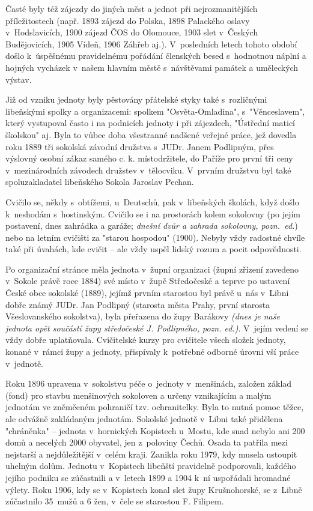 \documentclass[a5paper, 11pt, twoside]{article}
\newcommand{\pozned}[1]{%
\textit{#1}}
\begin{document}
Časté byly též zájezdy do jiných měst a jednot při nejrozmanitějších příležitostech (např. 1893 zájezd do Polska, 1898 Palackého oslavy v~Hodslavicích, 1900 zájezd ČOS do Olomouce, 1903 slet v~Českých Budějovicích, 1905 Vídeň, 1906 \mbox{Záhřeb} aj.). V~posledních letech tohoto období došlo k~úspěšnému pravidelnému pořádání členských besed s~hodnotnou náplní a hojných vycházek v~našem hlavním městě s~návštěvami památek a uměleckých výstav.

Již od vzniku jednoty byly pěstovány přátelské styky také s~rozličnými libeňskými spolky a organizacemi: spolkem "Osvěta-Omladina", s~"Věnceslavem", který vystupoval často i na podnicích jednoty i při zájezdech, "Ústřední maticí školskou" aj. Byla to vůbec doba všestranné nadšené veřejné práce, jež dovedla roku 1889 tři sokolská závodní družstva s~JUDr. Janem Podlipným, přes výslovný osobní zákaz samého c. k. místodržitele, do Paříže pro první tři ceny v~mezinárodních závodech družstev v~tělocviku. V~prvním družstvu byl také spoluzakladatel libeňského Sokola Jaroslav Pechan.

Cvičilo se, někdy s~obtížemi, u~Deutschů, pak v~libeňských školách, když došlo k~neshodám s~hostinským. Cvičilo se i na prostorách kolem sokolovny (po jejím postavení, dnes zahrádka a garáže; \pozned{dnešní dvůr a zahrada sokolovny, pozn.~ed.}) nebo na letním cvičišti za "starou hospodou" (1900). Nebyly vždy radostné chvíle také při úvahách, kde cvičit – ale vždy uspěl lidský rozum a pocit odpovědnosti. 

Po organizační stránce měla jednota v~župní organizaci (župní zřízení zavedeno v~Sokole právě roce 1884) své místo v~župě Středočeské a teprve po ustavení České obce sokolské (1889), jejímž prvním starostou byl právě u~nás v~Libni dobře známý JUDr. Jan Podlipný (starosta města Prahy, první starosta Všeslovanského sokolstva), byla přeřazena do župy Barákovy \pozned{(dnes je naše jednota opět součástí župy středočeské J. Podlipného, pozn. ed.)}. V~jejím vedení se vždy dobře uplatňovala. Cvičitelské kurzy pro cvičitele všech složek jednoty, konané v~rámci župy a jednoty, přispívaly k~potřebné odborné úrovni vší práce v~jednotě.

Roku 1896 upravena v~sokolstvu péče o~jednoty v~menšinách, založen základ (fond) pro stavbu menšinových sokoloven a určeny vznikajícím a malým jednotám ve zněmčeném pohraničí tzv. ochranitelky. Byla to nutná pomoc těžce, ale odvážně zakládaným jednotám. Sokolské jednotě v~Libni také přidělena "chráněnka" – jednota v~hornických Kopistech u~Mostu, kde snad nebylo ani 200 domů a necelých 2000 obyvatel, jen z~poloviny Čechů. Osada ta patřila mezi nejstarší a nejdůležitější v~celém kraji. Zanikla roku 1979, kdy musela ustoupit uhelným dolům. Jednotu v~Kopistech libeňští pravidelně podporovali, každého jejího podniku se zúčastnili a v~letech 1899 a 1904 k~ní uspořádali hromadné výlety. Roku 1906, kdy se v~Kopistech konal slet župy Krušnohorské, se z~Libně zúčastnilo 35~mužů a 6 žen, v~čele se starostou F. Filipem.
\end{document}
